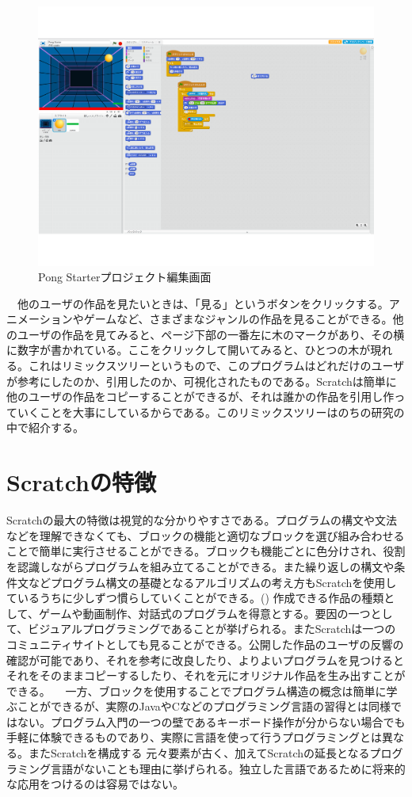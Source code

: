 \documentclass[a4paper,10pt,onecolumn,oneside,openany]{jsbook}
\begin{document}
 \begin{figure}[!h]
  \centering
   \includegraphics[scale=0.5]{pong_starter_editor.pdf}
  \caption{Pong Starterプロジェクト編集画面}
  \label{pseditor}
 \end{figure}
　他のユーザの作品を見たいときは、「見る」というボタンをクリックする。アニメーションやゲームなど、さまざまなジャンルの作品を見ることができる。他のユーザの作品を見てみると、ページ下部の一番左に木のマークがあり、その横に数字が書かれている。ここをクリックして開いてみると、ひとつの木が現れる。これはリミックスツリーというもので、このプログラムはどれだけのユーザが参考にしたのか、引用したのか、可視化されたものである。Scratchは簡単に他のユーザの作品をコピーすることができるが、それは誰かの作品を引用し作っていくことを大事にしているからである。このリミックスツリーはのちの研究の中で紹介する。
\section{Scratchの特徴}
Scratchの最大の特徴は視覚的な分かりやすさである。プログラムの構文や文法などを理解できなくても、ブロックの機能と適切なブロックを選び組み合わせることで簡単に実行させることができる。ブロックも機能ごとに色分けされ、役割を認識しながらプログラムを組み立てることができる。また繰り返しの構文や条件文などプログラム構文の基礎となるアルゴリズムの考え方もScratchを使用しているうちに少しずつ慣らしていくことができる。(\cite{scratch_article}) 作成できる作品の種類として、ゲームや動画制作、対話式のプログラムを得意とする。要因の一つとして、ビジュアルプログラミングであることが挙げられる。またScratchは一つのコミュニティサイトとしても見ることができる。公開した作品のユーザの反響の確認が可能であり、それを参考に改良したり、よりよいプログラムを見つけるとそれをそのままコピーするしたり、それを元にオリジナル作品を生み出すことができる。
　一方、ブロックを使用することでプログラム構造の概念は簡単に学ぶことができるが、実際のJavaやCなどのプログラミング言語の習得とは同様ではない。プログラム入門の一つの壁であるキーボード操作が分からない場合でも手軽に体験できるものであり、実際に言語を使って行うプログラミングとは異なる。またScratchを構成する%
元々要素が古く、加えてScratchの延長となるプログラミング言語がないことも理由に挙げられる。独立した言語であるために将来的な応用をつけるのは容易ではない。
\end{document}
